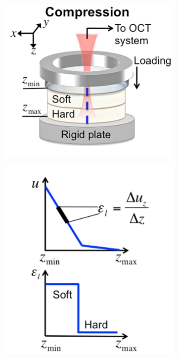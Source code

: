 \begin{figure}
	\centering
	\begin{subfigure}{0.4\textwidth}
    	\centering
        \includegraphics[width=\textwidth]{bground_figs/oce_hardware.png}
    \end{subfigure}
    \begin{subfigure}{0.3\textwidth}
    	\centering
        \includegraphics[width=\textwidth]{bground_figs/ascan_example.png}
    \end{subfigure}
    \label{oce_system}
\end{figure}

